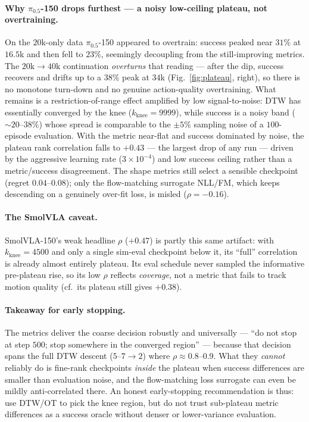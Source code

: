 \documentclass[11pt]{article}
\begin{document}
\paragraph{Why $\pi_{0.5}$-150 drops furthest --- a noisy low-ceiling plateau, not overtraining.}
On the $20$k-only data $\pi_{0.5}$-150 appeared to overtrain: success peaked near $31\%$ at $16.5$k and
then fell to $23\%$, seemingly decoupling from the still-improving metrics. The $20\text{k}\!\to\!40\text{k}$
continuation \emph{overturns} that reading --- after the dip, success recovers and drifts up to a $38\%$
peak at $34$k (Fig.~\ref{fig:plateau}, right), so there is no monotone turn-down and no genuine action-quality
overtraining. What remains is a restriction-of-range effect amplified by low signal-to-noise: DTW has
essentially converged by the knee ($k_{\text{knee}}=9999$), while success is a noisy band
($\sim\!20$--$38\%$) whose spread is comparable to the $\pm5\%$ sampling noise of a $100$-episode
evaluation. With the metric near-flat and success dominated by noise, the plateau rank correlation falls
to $+0.43$ --- the largest drop of any run --- driven by the aggressive learning rate ($3\times10^{-4}$)
and low success ceiling rather than a metric/success disagreement. The shape metrics still select a
sensible checkpoint (regret $0.04$--$0.08$); only the flow-matching surrogate NLL/FM, which keeps
descending on a genuinely over-fit loss, is misled ($\rho=-0.16$).

\paragraph{The SmolVLA caveat.}
SmolVLA-150's weak headline $\rho$ ($+0.47$) is partly this same artifact: with $k_{\text{knee}}=4500$
and only a single sim-eval checkpoint below it, its ``full'' correlation is already almost entirely
plateau. Its eval schedule never sampled the informative pre-plateau rise, so its low $\rho$ reflects
\emph{coverage}, not a metric that fails to track motion quality (cf.\ its plateau still gives $+0.38$).

\paragraph{Takeaway for early stopping.}
The metrics deliver the coarse decision robustly and universally --- ``do not stop at step $500$; stop
somewhere in the converged region'' --- because that decision spans the full DTW descent ($5$--$7\to2$)
where $\rho\approx0.8$--$0.9$. What they \emph{cannot} reliably do is fine-rank checkpoints \emph{inside}
the plateau when success differences are smaller than evaluation noise, and the flow-matching loss
surrogate can even be mildly anti-correlated there. An honest early-stopping recommendation is thus: use DTW/OT to pick the knee
region, but do not trust sub-plateau metric differences as a success oracle without denser or
lower-variance evaluation.
\end{document}

